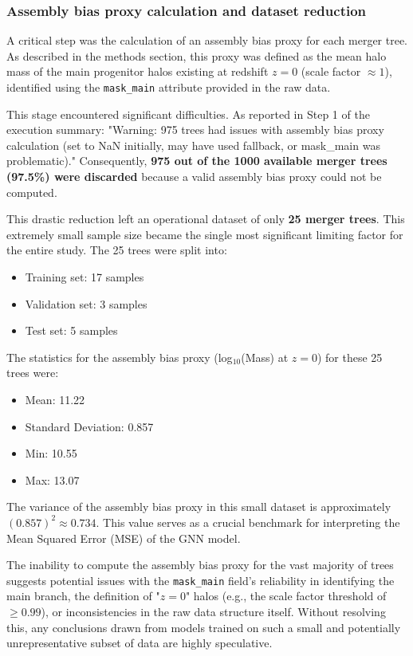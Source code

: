 \documentclass[twocolumn]{aastex631}
\begin{document}
\subsubsection{Assembly bias proxy calculation and dataset reduction}
A critical step was the calculation of an assembly bias proxy for each merger tree. As described in the methods section, this proxy was defined as the mean halo mass of the main progenitor halos existing at redshift $z=0$ (scale factor $\approx 1$), identified using the \texttt{mask\_main} attribute provided in the raw data.

This stage encountered significant difficulties. As reported in Step 1 of the execution summary: "Warning: 975 trees had issues with assembly bias proxy calculation (set to NaN initially, may have used fallback, or mask\_main was problematic)." Consequently, \textbf{975 out of the 1000 available merger trees (97.5\%) were discarded} because a valid assembly bias proxy could not be computed.

This drastic reduction left an operational dataset of only \textbf{25 merger trees}. This extremely small sample size became the single most significant limiting factor for the entire study. The 25 trees were split into:
\begin{itemize}
    \item Training set: 17 samples
    \item Validation set: 3 samples
    \item Test set: 5 samples
\end{itemize}

The statistics for the assembly bias proxy (log$_{10}$(Mass) at $z=0$) for these 25 trees were:
\begin{itemize}
    \item Mean: 11.22
    \item Standard Deviation: 0.857
    \item Min: 10.55
    \item Max: 13.07
\end{itemize}

The variance of the assembly bias proxy in this small dataset is approximately $(0.857)^2 \approx 0.734$. This value serves as a crucial benchmark for interpreting the Mean Squared Error (MSE) of the GNN model.

The inability to compute the assembly bias proxy for the vast majority of trees suggests potential issues with the \texttt{mask\_main} field's reliability in identifying the main branch, the definition of "$z=0$" halos (e.g., the scale factor threshold of $\geq 0.99$), or inconsistencies in the raw data structure itself. Without resolving this, any conclusions drawn from models trained on such a small and potentially unrepresentative subset of data are highly speculative.
\end{document}

